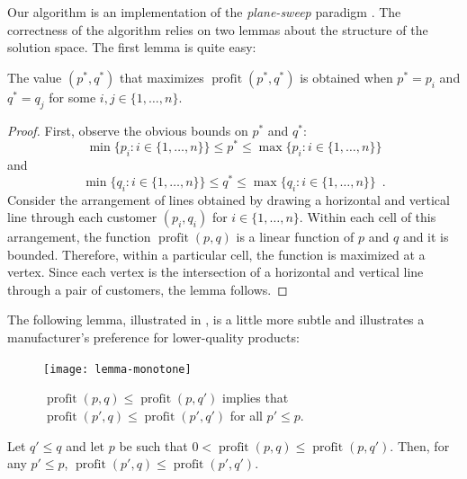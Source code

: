 \documentclass[lotsofwhite]{patmorin}
\newcommand{\val}{\operatorname{profit}}
\begin{document}
Our algorithm is an implementation of the \emph{plane-sweep} paradigm
\cite{bo79}. The correctness of the algorithm relies on two lemmas about
the structure of the solution space.  The first lemma is quite easy:
\begin{lem}
  The value $(p^*,q^*)$ that maximizes $\val(p^*,q^*)$ is obtained when
  $p^* = p_i$ and $q^*=q_j$ for some $i,j\in\{1,\ldots,n\}$.
\end{lem}

\begin{proof}
  First, observe the obvious bounds on $p^*$ and $q^*$:
  \[
     \min\{p_i:i\in\{1,\ldots,n\}\} \le p^* 
      \le \max\{p_i:i\in\{1,\ldots,n\}\} 
  \] 
  and 
  \[
     \min\{q_i:i\in\{1,\ldots,n\}\} \le q^* 
      \le \max\{q_i:i\in\{1,\ldots,n\}\} \enspace .
  \] 
  Consider the arrangement of lines obtained by drawing a
  horizontal and vertical line through each customer $(p_i,q_i)$
  for $i\in\{1,\ldots,n\}$.  Within each cell of this arrangement,
  the function $\val(p,q)$ is a linear function of $p$ and $q$ and it is
  bounded.  Therefore, within a particular cell, the function is maximized
  at a vertex.  Since each vertex is the intersection of a horizontal
  and vertical line through a pair of customers, the lemma follows.
\end{proof}

The following lemma, illustrated in , is a
little more subtle and illustrates a manufacturer's preference for
lower-quality products:
\begin{figure}
  \begin{center}
    \texttt{[image: lemma-monotone]}
  \end{center}
  \caption{$\val(p,q) \le \val(p,q')$ implies that $\val(p',q) \le
           \val(p',q')$ for all $p' \le p$.}
\end{figure}

\begin{lem}
  Let $q' \le q$ and let $p$ be such that $0 < \val(p,q) \le \val(p,q')$.
  Then, for any $p' \le p$, $\val(p',q) \le \val(p',q')$.
\end{lem}
\end{document}
